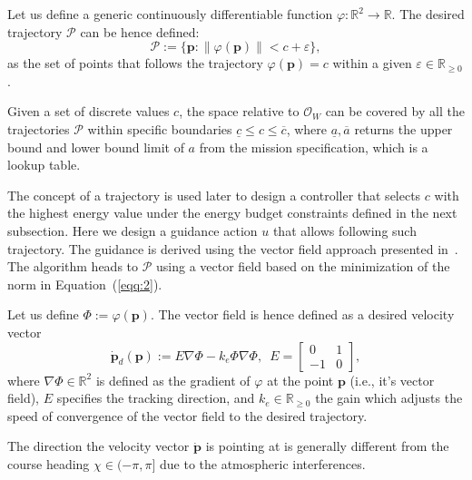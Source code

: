 \documentclass[letterpaper,10pt,conference]{ieeeconf}
\begin{document}
Let us define a generic continuously differentiable function $\varphi:\mathbb{R}^2\rightarrow\mathbb{R}$. The desired trajectory $\mathcal{P}$ can be hence defined:
\begin{equation}\label{eqq:2}
  \mathcal{P}:=\{\mathbf{p}:\|\varphi(\mathbf{p})\|<c+\varepsilon\},
\end{equation}
as the set of points that follows the trajectory $\varphi(\mathbf{p})=c$ within a given $\varepsilon\in\mathbb{R}_{\geq 0}$. 

Given a set of discrete values $c$, the space relative to $\mathcal{O}_W$ can be covered by all the trajectories $\mathcal{P}$ within specific boundaries $\underline{c}\leq c\leq \overline{c}$, where $\underline{a},\overline{a}$ returns the upper bound and lower bound limit of $a$ from the mission specification, which is a lookup table.

The concept of a trajectory is used later to design a controller that selects $c$ with the highest energy value under the energy budget constraints defined in the next subsection. Here we design a guidance action $u$ that allows following such trajectory. The guidance is derived using the vector field approach presented in~\cite{de2017guidance}. The algorithm heads to $\mathcal{P}$ using a vector field based on the minimization of the norm in Equation~(\ref{eqq:2}).

Let us define $\varPhi:=\varphi(\mathbf{p})$. The vector field is hence defined as a desired velocity vector
\begin{equation}\label{eqq:3}
  \dot{\mathbf{p}}_d(\mathbf{p}):=E\nabla\varPhi-k_e\varPhi\nabla\varPhi,\,\,\,E=\begin{bmatrix}
    0&1\\-1&0
  \end{bmatrix},
\end{equation}
where $\nabla\varPhi\in\mathbb{R}^2$ is defined as the gradient of $\varphi$ at the point $\mathbf{p}$ (i.e., it's vector field), $E$ specifies the tracking direction, and $k_e\in\mathbb{R}_{\geq 0}$ the gain which adjusts the speed of convergence of the vector field to the desired trajectory.

The direction the velocity vector $\dot{\mathbf{p}}$ is pointing at is generally different from the course heading $\chi\in(-\pi,\pi]$ due to the atmospheric interferences.
\end{document}
